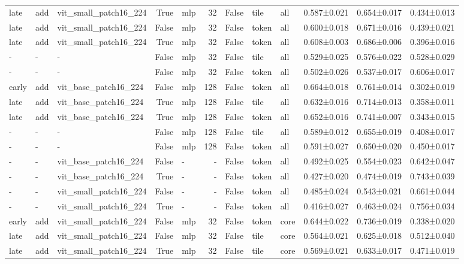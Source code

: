 \begin{table}
\begin{tabular}{lllrlrrlllll}
late & add & vit\_small\_patch16\_224 & True & mlp & 32 & False & tile & all & 0.587±0.021 & 0.654±0.017 & 0.434±0.013 \\
late & add & vit\_small\_patch16\_224 & False & mlp & 32 & False & token & all & 0.600±0.018 & 0.671±0.016 & 0.439±0.021 \\
late & add & vit\_small\_patch16\_224 & True & mlp & 32 & False & token & all & 0.608±0.003 & 0.686±0.006 & 0.396±0.016 \\
- & - & - & False & mlp & 32 & False & tile & all & 0.529±0.025 & 0.576±0.022 & 0.528±0.029 \\
- & - & - & False & mlp & 32 & False & token & all & 0.502±0.026 & 0.537±0.017 & 0.606±0.017 \\
early & add & vit\_base\_patch16\_224 & False & mlp & 128 & False & token & all & 0.664±0.018 & 0.761±0.014 & 0.302±0.019 \\
late & add & vit\_base\_patch16\_224 & True & mlp & 128 & False & tile & all & 0.632±0.016 & 0.714±0.013 & 0.358±0.011 \\
late & add & vit\_base\_patch16\_224 & True & mlp & 128 & False & token & all & 0.652±0.016 & 0.741±0.007 & 0.343±0.015 \\
- & - & - & False & mlp & 128 & False & tile & all & 0.589±0.012 & 0.655±0.019 & 0.408±0.017 \\
- & - & - & False & mlp & 128 & False & token & all & 0.591±0.027 & 0.650±0.020 & 0.450±0.017 \\
- & - & vit\_base\_patch16\_224 & False & - & - & False & token & all & 0.492±0.025 & 0.554±0.023 & 0.642±0.047 \\
- & - & vit\_base\_patch16\_224 & True & - & - & False & token & all & 0.427±0.020 & 0.474±0.019 & 0.743±0.039 \\
- & - & vit\_small\_patch16\_224 & False & - & - & False & token & all & 0.485±0.024 & 0.543±0.021 & 0.661±0.044 \\
- & - & vit\_small\_patch16\_224 & True & - & - & False & token & all & 0.416±0.027 & 0.463±0.024 & 0.756±0.034 \\
early & add & vit\_small\_patch16\_224 & False & mlp & 32 & False & token & core & 0.644±0.022 & 0.736±0.019 & 0.338±0.020 \\
late & add & vit\_small\_patch16\_224 & False & mlp & 32 & False & tile & core & 0.564±0.021 & 0.625±0.018 & 0.512±0.040 \\
late & add & vit\_small\_patch16\_224 & True & mlp & 32 & False & tile & core & 0.569±0.021 & 0.633±0.017 & 0.471±0.019 \\

\end{tabular}
\end{table}
